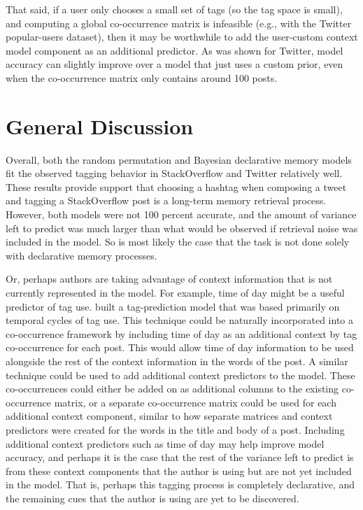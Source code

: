 \documentclass[man,floatsintext,donotrepeattitle]{apa6}
\begin{document}
That said, if a user only chooses a small set of tags (so the tag space is small), and computing a global co-occurrence matrix is infeasible (e.g., with the Twitter popular-users dataset), 
then it may be worthwhile to add the user-custom context model component as an additional predictor.
As was shown for Twitter, model accuracy can slightly improve over a model that just uses a custom prior, even when the co-occurrence matrix only contains around 100 posts.

\section{General Discussion}

Overall, both the random permutation and Bayesian declarative memory models fit the observed tagging behavior in StackOverflow and Twitter relatively well.
These results provide support that choosing a hashtag when composing a tweet and tagging a StackOverflow post is a long-term memory retrieval process.
However, both models were not 100 percent accurate, and the amount of variance left to predict was much larger than what would be observed if retrieval noise was included in the model.
So is most likely the case that the task is not done solely with declarative memory processes.

Or, perhaps authors are taking advantage of context information that is not currently represented in the model.
For example, time of day might be a useful predictor of tag use.
\textcite{Cohn2012} built a tag-prediction model that was based primarily on temporal cycles of tag use.
This technique could be naturally incorporated into a co-occurrence framework by including time of day as an additional context by tag co-occurrence for each post.
This would allow time of day information to be used alongside the rest of the context information in the words of the post.
A similar technique could be used to add additional context predictors to the model.
These co-occurrences could either be added on as additional columns to the existing co-occurrence matrix,
or a separate co-occurrence matrix could be used for each additional context component, similar to how separate matrices and context predictors were created for the words in the title and body of a post. 
Including additional context predictors such as time of day may help improve model accuracy,
and perhaps it is the case that the rest of the variance left to predict is from these context components that the author is using but are not yet included in the model.
That is, perhaps this tagging process is completely declarative, and the remaining cues that the author is using are yet to be discovered.
\end{document}
